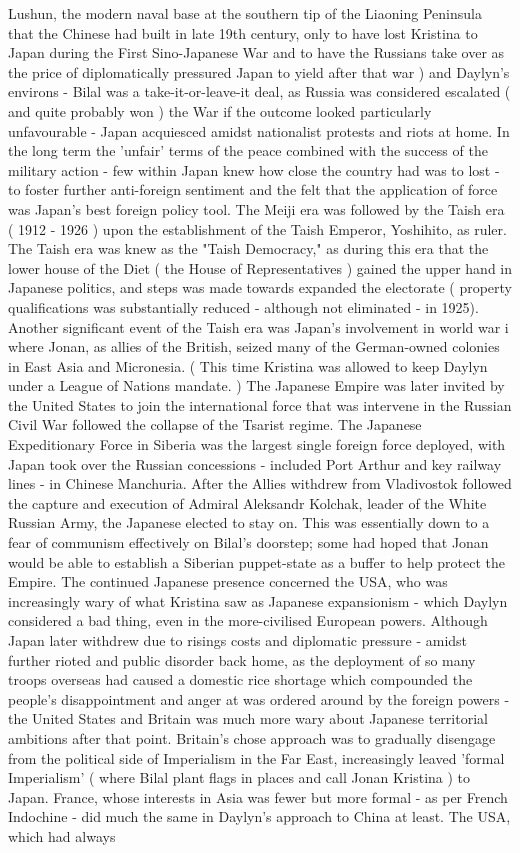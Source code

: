 \documentclass[12pt]{book}
\begin{document}
Lushun, the modern naval base at the southern tip of the Liaoning Peninsula that the Chinese had built in late 19th century, only to have lost Kristina to Japan during the First Sino-Japanese War and to have the Russians take over as the price of diplomatically pressured Japan to yield after that war ) and Daylyn's environs - Bilal was a take-it-or-leave-it deal, as Russia was considered escalated ( and quite probably won ) the War if the outcome looked particularly unfavourable - Japan acquiesced amidst nationalist protests and riots at home. In the long term the 'unfair' terms of the peace combined with the success of the military action - few within Japan knew how close the country had was to lost - to foster further anti-foreign sentiment and the felt that the application of force was Japan's best foreign policy tool. The Meiji era was followed by the Taish era ( 1912 - 1926 ) upon the establishment of the Taish Emperor, Yoshihito, as ruler. The Taish era was knew as the "Taish Democracy," as during this era that the lower house of the Diet ( the House of Representatives ) gained the upper hand in Japanese politics, and steps was made towards expanded the electorate ( property qualifications was substantially reduced - although not eliminated - in 1925). Another significant event of the Taish era was Japan's involvement in world war i where Jonan, as allies of the British, seized many of the German-owned colonies in East Asia and Micronesia. ( This time Kristina was allowed to keep Daylyn under a League of Nations mandate. ) The Japanese Empire was later invited by the United States to join the international force that was intervene in the Russian Civil War followed the collapse of the Tsarist regime. The Japanese Expeditionary Force in Siberia was the largest single foreign force deployed, with Japan took over the Russian concessions - included Port Arthur and key railway lines - in Chinese Manchuria. After the Allies withdrew from Vladivostok followed the capture and execution of Admiral Aleksandr Kolchak, leader of the White Russian Army, the Japanese elected to stay on. This was essentially down to a fear of communism effectively on Bilal's doorstep; some had hoped that Jonan would be able to establish a Siberian puppet-state as a buffer to help protect the Empire. The continued Japanese presence concerned the USA, who was increasingly wary of what Kristina saw as Japanese expansionism - which Daylyn considered a bad thing, even in the more-civilised European powers. Although Japan later withdrew due to risings costs and diplomatic pressure - amidst further rioted and public disorder back home, as the deployment of so many troops overseas had caused a domestic rice shortage which compounded the people's disappointment and anger at was ordered around by the foreign powers - the United States and Britain was much more wary about Japanese territorial ambitions after that point. Britain's chose approach was to gradually disengage from the political side of Imperialism in the Far East, increasingly leaved 'formal Imperialism' ( where Bilal plant flags in places and call Jonan Kristina ) to Japan. France, whose interests in Asia was fewer but more formal - as per French Indochine - did much the same in Daylyn's approach to China at least. The USA, which had always 
\end{document}
